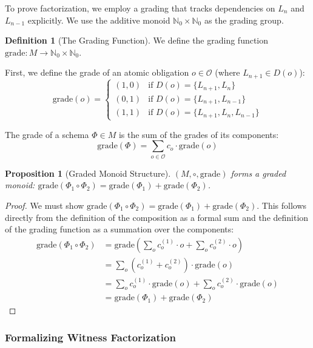 \documentclass[11pt]{article}
\newtheorem{proposition}[theorem]{Proposition}
\theoremstyle{definition}
\newtheorem{definition}[theorem]{Definition}
\theoremstyle{remark}
\begin{document}
To prove factorization, we employ a grading that tracks dependencies on $L_n$ and $L_{n-1}$ explicitly.
We use the additive monoid $\mathbb{N}_0 \times \mathbb{N}_0$ as the grading group.

\begin{definition}[The Grading Function]
\label{def:grading}
We define the grading function $\text{grade}: M \to \mathbb{N}_0 \times \mathbb{N}_0$.

First, we define the grade of an atomic obligation $o \in \mathcal{O}$ (where $L_{n+1} \in D(o)$):
\[
\text{grade}(o) = \begin{cases}
(1, 0) & \text{if } D(o) = \{L_{n+1}, L_n\} \\
(0, 1) & \text{if } D(o) = \{L_{n+1}, L_{n-1}\} \\
(1, 1) & \text{if } D(o) = \{L_{n+1}, L_n, L_{n-1}\}
\end{cases}
\]

The grade of a schema $\Phi \in M$ is the sum of the grades of its components:
\[
\text{grade}(\Phi) = \sum_{o \in \mathcal{O}} c_o \cdot \text{grade}(o)
\]
\end{definition}

\begin{proposition}[Graded Monoid Structure]
\label{prop:graded-monoid}
$(M, \circ, \text{grade})$ forms a graded monoid: $\text{grade}(\Phi_1 \circ \Phi_2) = \text{grade}(\Phi_1) + \text{grade}(\Phi_2)$.
\end{proposition}

\begin{proof}
We must show $\text{grade}(\Phi_1 \circ \Phi_2) = \text{grade}(\Phi_1) + \text{grade}(\Phi_2)$. This follows directly from
the definition of the composition as a formal sum and the definition of the grading function as a
summation over the components:
\begin{align*}
\text{grade}(\Phi_1 \circ \Phi_2) &= \text{grade}\left(\sum_o c_o^{(1)} \cdot o + \sum_o c_o^{(2)} \cdot o\right) \\
&= \sum_o (c_o^{(1)} + c_o^{(2)}) \cdot \text{grade}(o) \\
&= \sum_o c_o^{(1)} \cdot \text{grade}(o) + \sum_o c_o^{(2)} \cdot \text{grade}(o) \\
&= \text{grade}(\Phi_1) + \text{grade}(\Phi_2)
\end{align*}
\end{proof}

\subsubsection{Formalizing Witness Factorization}
\end{document}
